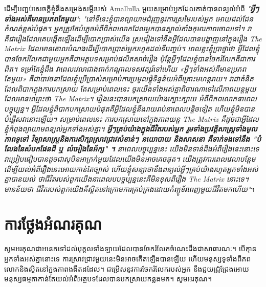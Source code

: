 \documentclass[10pt,twocolumn,letterpaper]{article}
\renewcommand{\refname}{ឯកសារយោង}
\begin{document}
	ដើម្បីបញ្ជប់សេចក្ដីខ្ញុំនឹងសម្រង់​សម្តីរបស់ Amallulla មួយសម្រាប់អ្នកដែលគាត់បានពន្យល់អំពី \textit{"\textbf{អ្វីៗទាំងអស់គឺមានប្រភពតែមួយ}"}: \textit{"នៅទីនេះខ្ញុំបានព្យាយាមជំរុញនូវការស្រមៃរបស់អ្នក អោយដល់ដែនកំណត់ខ្ពស់បំផុត។ អ្នកត្រូវតែបំភ្លេចអំពីពិភពលោកដែលអ្នកបានស្គាល់តាំងកុមារភាពចោលទៅ។ វាគឺជារឿងដែលគេបង្កើតឡើងដើម្បីបោកប្រាស់យើង ស្រដៀងទៅនឹងអ្វីដែលបានបង្ហាញនៅក្នុងរឿង The Matrix ដែលមានគោលបំណងដើម្បីបោកប្រាស់អ្នករហូតដល់ទីបញ្ចប់។ ពេលខ្លះខ្ញុំប្រាថ្នាថា អ្វីដែលខ្ញុំបានចែករំលែកជាមួយអ្នកគឺជាអត្ថបទសម្រាប់ផលិតសាច់រឿង  ប៉ុន្តែអ្វីៗដែលខ្ញុំបានចែករំលែកគឺជាការពិត។ ទម្រាំតែខ្ញុំដឹង វាពេលវេលាជាងពាក់កណ្តាលទសវត្សរ៍ទៅហើយ «អ្វីៗទាំងអស់គឺមានប្រភពតែមួយ» គឺជាបាវចនាដែលខ្ញុំប្រើប្រាស់សម្រាប់ការប្រមូលផ្តុំទិន្នន័យអំពីគ្រោះមហន្តរាយ។ វាជាគំនិតដែលពិបាកក្នុងការបកស្រាយ តែសម្រាប់ពេលនេះ ចូរយើងទាំងអស់គ្នាពិចារណាទៅលើភាពយន្តមួយដែលមានឈ្មោះថា The Matrix។ រឿងនេះបានបកស្រាយយ៉ាងក្បោះក្បាយ អំពីពិភពលោកនាពេលបច្ចុប្បន្ន។ អ្វីដែលខ្ញុំពិបាកបកស្រាយបំផុតគឺអ្វីដែលខ្ញុំនឹងរាយរាប់នាពេលបន្តិចទៀត ហើយខ្ញុំមិនបានបំផ្លើសវានោះឡើយ។  សម្រាប់ពេលនេះ ការបកស្រាយនៅក្នុងភាពយន្ត The Matrix គឺដូចជាអ្វីដែលខ្ញុំកំពុងព្យាយាមពន្យល់អ្នកទាំងអស់គ្នា។ \textbf{អ្វីៗគ្រប់យ៉ាងក្នុងជីវិតរបស់អ្នក រួមទាំងប្រវត្តិសាស្ត្រទាំងមូល ភាពទូទៅ វិទ្យាសាស្ត្រនិងការសិក្សាស្រាវជ្រាវសំខាន់ៗ  នយោបាយ និងសាសនា គឺទាក់ទងទៅនឹង "បំលែងនៃសំបកផែនដី ឬ លំអៀងនៃអ័ក្ស" ។} នាពេលបច្ចុប្បន្ននេះ យើងមិនទាន់ដឹងអំពីរឿងនេះនោះទេ វាប្រៀបធៀបបានដូចជាសុបិនអាក្រក់មួយដែលយើងមិនអាចគេចផុត។ យើងត្រូវការពេលវេលាបន្តែមដើម្បីយល់អំពីរឿងនេះអោយកាន់តែច្បាស់ ហើយខ្ញុំសន្យាថានឹងពន្យល់អ្វីៗគ្រប់យ៉ាងរហូតអ្នកទាំងអស់គ្នាបានយល់ ថាជីវិតរបស់ពួកយើងនាពេលបបច្ចប្បន្ននេះគឺមិនខុសពីរឿង The Matrix នោះទេ។ មានន័យថា ជីវិតរបស់ពួកយើងគឺស្ថិតនៅក្រោមការគ្រប់គ្រងដោយកំព្យូទ័រពេញមួយជីវិតមកហើយ"}\cite{33,34}។

\section{ការថ្លែងអំណរគុណ}

	សូមអរគុណជាអនេកទៅដល់បុគ្គលទាំងឡាយ​ដែលបានចែករំលែកចំណេះដឹងជាសាធារណៈ។ បើគ្មានអ្នកទាំងអស់គ្នានោះទេ ការស្រាវជ្រាវមួយនេះមិនអាចកើតឡើងបានឡើយ ហើយមនុស្សទូទាំងពីភពលោកនិងស្ថិតនៅក្នុងភាពងងឹតដដែល។ ជម្រើសនូវការចែករំលែករបស់អ្នក នឹងជួយជ្រុំជ្រែងអោយមនុស្សធម្មតាកាន់តែយល់អំពីអត្ថបទដែលបានបកស្រាយកន្លងមក។ សូមអរគុណ។ 
\clearpage
\twocolumn

{\small
\renewcommand{\refname}{ឯកសារយោង}


}
\end{document}
